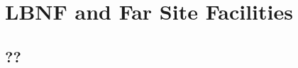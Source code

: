 \chapter{LBNF and Far Site Facilities}
\label{ch:exec-summ-lbnf}


\section{??}
\label{sec:exec-summ-lbnf-??}

